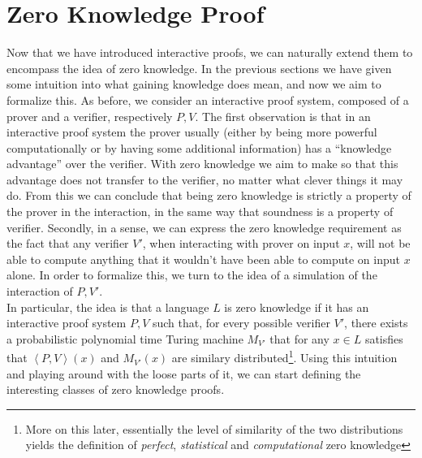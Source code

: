 \documentclass{article}
\begin{document}
\section{Zero Knowledge Proof}
\label{zkp}
Now that we have introduced interactive proofs, we can naturally extend them to encompass the idea of zero knowledge. In the previous sections we have given some intuition into what gaining knowledge does mean, and now we aim to formalize this. As before, we consider an interactive proof system, composed of a prover and a verifier, respectively $P, V$. The first observation is that in an interactive proof system the prover usually (either by being more powerful computationally or by having some additional information) has a \enquote{knowledge advantage} over the verifier. With zero knowledge we aim to make so that this advantage does not transfer to the verifier, no matter what clever things it may do. From this we can conclude that being zero knowledge is strictly a property of the prover in the interaction, in the same way that soundness is a property of verifier. Secondly, in a sense, we can express the zero knowledge requirement as the fact that any verifier $V'$, when interacting with prover on input $x$, will not be able to compute anything that it wouldn't have been able to compute on input $x$ alone. In order to formalize this, we turn to the idea of a simulation of the interaction of $P, V'$. \\
In particular, the idea is that a language $L$ is zero knowledge if it has an interactive proof system $P, V$ such that, for every possible verifier $V'$, there exists a probabilistic polynomial time Turing machine $M_{V'}$ that for any $x \in L$ satisfies that $\left<P, V\right>(x)$ and $M_{V'}(x)$ are similary distributed\footnote{More on this later, essentially the level of similarity of the two distributions yields the definition of \textit{perfect}, \textit{statistical} and \textit{computational} zero knowledge}.
Using this intuition and playing around with the loose parts of it, we can start defining the interesting classes of zero knowledge proofs.
\end{document}
